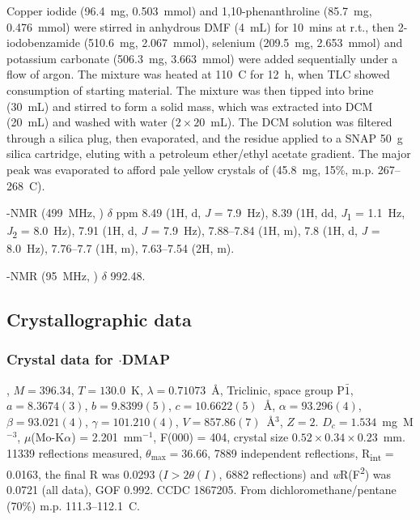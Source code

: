 \begin{refsection}
    Copper iodide (96.4~mg, 0.503~mmol) and 1,10-phenanthroline (85.7~mg, 0.476~mmol) were stirred in anhydrous DMF (4~mL) for 10~mins at r.t., then 2-iodobenzamide (510.6~mg, 2.067~mmol), selenium (209.5~mg, 2.653~mmol) and potassium carbonate (506.3~mg, 3.663~mmol) were added sequentially under a flow of argon.
    The mixture was heated at 110~\degree{}C for 12~h, when TLC showed consumption of starting material.
    The mixture was then tipped into brine (30~mL) and stirred to form a solid mass, which was extracted into DCM (20~mL) and washed with water ($ 2 \times 20 $~mL).
    The DCM solution was filtered through a silica plug, then evaporated, and the residue applied to a SNAP 50~g silica cartridge, eluting with a petroleum ether/ethyl acetate gradient.
    The major peak was evaporated to afford pale yellow crystals of  (45.8~mg, 15\%, m.p. 267--268~\degree{}C). 
    
    -NMR (499~MHz, ) $\delta$ ppm 8.49 (1H, d, \textit{J} = 7.9~Hz), 8.39 (1H, dd, \textit{J}\textsubscript{1} = 1.1~Hz, \textit{J}\textsubscript{2} = 8.0~Hz), 7.91 (1H, d, \textit{J} = 7.9~Hz), 7.88--7.84 (1H, m), 7.8 (1H, d, \textit{J} = 8.0~Hz), 7.76--7.7 (1H, m), 7.63--7.54 (2H, m).
    
    -NMR (95~MHz, ) $ \delta $ 992.48.
    
    \subsection{Crystallographic data}\label{sec:ch3-si}
    
    \subsubsection{Crystal data for \texorpdfstring{$ \cdot $DMAP}{C20H19N3OSe}}
    , $M=396.34$, $T=130.0$~K, $ \lambda=0.71073 $~\AA, Triclinic, space group P$\bar{1}$, $a = 8.3674(3)$, $b = 9.8399(5)$, $c =10.6622(5)$~\AA, $\alpha=93.296(4)$\degree, $\beta=93.021(4)$\degree, $\gamma=101.210(4)$\degree, $V=857.86(7)$~\AA$^{3}$, $Z = 2$.
    $D_{c}= 1.534$~mg~M$^{-3}$, $\mu$(Mo-K$\alpha$) = 2.201~mm$^{-1}$, F(000) = 404, crystal size $0.52 \times 0.34 \times 0.23$~mm.
    11339 reflections measured, $\theta_{\max}=36.66$\degree, 7889 independent reflections, R\textsubscript{int} = 0.0163, the final R was 0.0293 ($I > 2\theta(I)$, 6882 reflections) and \textit{w}R(F\textsuperscript{2}) was 0.0721 (all data), GOF 0.992.
    CCDC 1867205.
    From dichloromethane/pentane (70\%) m.p. 111.3--112.1~\degree{}C.
    

\end{refsection}
